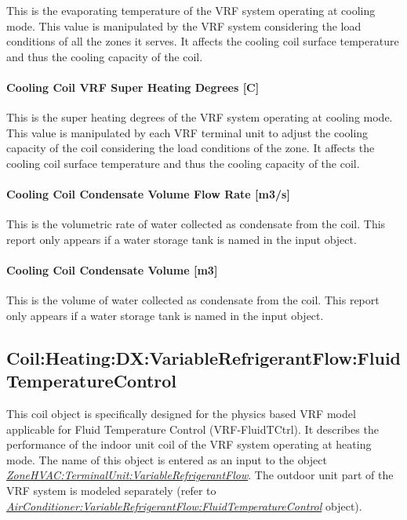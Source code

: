 This is the evaporating temperature of the VRF system operating at cooling mode. This value is manipulated by the VRF system considering the load conditions of all the zones it serves. It affects the cooling coil surface temperature and thus the cooling capacity of the coil.

\paragraph{Cooling Coil VRF Super Heating Degrees {[}C{]}}\label{cooling-coil-vrf-super-heating-degrees-c}

This is the super heating degrees of the VRF system operating at cooling mode. This value is manipulated by each VRF terminal unit to adjust the cooling capacity of the coil considering the load conditions of the zone. It affects the cooling coil surface temperature and thus the cooling capacity of the coil.

\paragraph{Cooling Coil Condensate Volume Flow Rate {[}m3/s{]}}\label{cooling-coil-condensate-volume-flow-rate-m3s-2}

This is the volumetric rate of water collected as condensate from the coil. This report only appears if a water storage tank is named in the input object.

\paragraph{Cooling Coil Condensate Volume {[}m3{]}}\label{cooling-coil-condensate-volume-m3-2}

This is the volume of water collected as condensate from the coil. This report only appears if a water storage tank is named in the input object.

\subsection{Coil:Heating:DX:VariableRefrigerantFlow:FluidTemperatureControl}\label{coilheatingdxvariablerefrigerantflowfluidtemperaturecontrol}

This coil object is specifically designed for the physics based VRF model applicable for Fluid Temperature Control (VRF-FluidTCtrl). It describes the performance of the indoor unit coil of the VRF system operating at heating mode. The name of this object is entered as an input to the object \emph{\hyperref[zonehvacterminalunitvariablerefrigerantflow]{ZoneHVAC:TerminalUnit:VariableRefrigerantFlow}}. The outdoor unit part of the VRF system is modeled separately (refer to \emph{\hyperref[airconditionervariablerefrigerantflowfluidtemperaturecontrol]{AirConditioner:VariableRefrigerantFlow:FluidTemperatureControl}} object).

